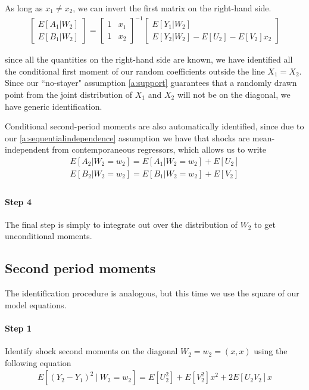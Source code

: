 \noindent As long as $x_1 \neq x_2$, we can invert the first matrix on the right-hand side. 
\begin{align}
  \begin{bmatrix}
    E[A_{1}|W_{2}] \\
    E[B_{1}|W_{2}]
  \end{bmatrix}
  =
  \begin{bmatrix}
    1 & x_1 \\
    1 & x_2  
  \end{bmatrix}^{-1}
  \begin{bmatrix}
    E[Y_{1}|W_{2}] \\  
    E[Y_{2}|W_{2}] - E[U_{2}] -  E[V_{2}]x_{2}  \label{eq:inversion}
  \end{bmatrix}
\end{align}

\noindent since all the quantities on the right-hand side are known, we have identified all the conditional first moment of our random coefficients outside the line $X_1 = X_2$. Since our ``no-stayer" assumption \ref{a:support} guarantees that a randomly drawn point from the joint distribution of $X_1$ and $X_2$ will not be on the diagonal, we have generic identification.

Conditional second-period moments are also automatically identified, since due to our \ref{a:sequentialindependence} assumption we have that shocks are mean-independent from contemporaneous regressors, which allows us to write
\begin{align}
  E[A_2 | W_2 = w_2] = E[A_1|W_2 = w_2] + E[U_2] \\
  E[B_2 | W_2 = w_2] = E[B_1|W_2 = w_2] + E[V_2] \\
\end{align}

\paragraph{Step 4} The final step is simply to integrate out over the distribution of $W_2$ to get unconditional moments. 

\subsection{Second period moments} The identification procedure is analogous, but this time we use the square of our model equations.

\paragraph{Step 1} Identify shock second moments on the diagonal $W_2 = w_2 = (x, x)$ using the following equation
\begin{align}
  E[(Y_{2} - Y_{1})^2 \ | \  W_{2} = w_{2}] = 
  E[U_{2}^2] + E[V_{2}^2]x^2 + 2E[U_{2}V_{2}]x
\end{align}

